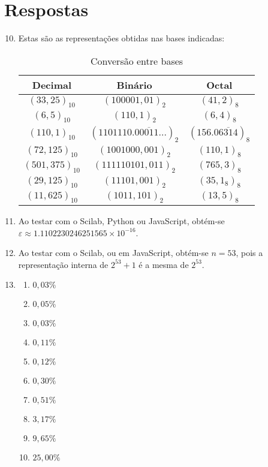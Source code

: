 \documentclass[12pt,a4paper]{article}
\begin{document}
\newpage
\section*{Respostas}
\begin{enumerate}
\setcounter{enumi}{9}
\item Estas são as representações obtidas nas bases indicadas:
\begin{table}[h]
\centering
\caption{Conversão entre bases}
\begin{tabular}{|c|c|c|}
\hline
  \textbf{Decimal}
& \textbf{Binário}
& \textbf{Octal} \\ \hline
  $(33,25)_{10}$
& $(100001,01)_2$
& $(41,2)_8$ \\ \hline
  $(6,5)_{10}$
& $(110,1)_2$
& $(6,4)_8$ \\ \hline
  $(110,1)_{10}$
& $(1101110.0\overline{0011}...)_2$
& $(156.0\overline{6314})_8$ \\ \hline
  $(72,125)_{10}$
& $(1001000,001)_2$
& $(110,1)_8$ \\ \hline
  $(501,375)_{10}$
& $(111110101,011)_2$
& $(765,3)_8$ \\ \hline
  $(29,125)_{10}$
& $(11101,001)_2$
& $(35,1_8)_8$ \\ \hline
  $(11,625)_{10}$
& $(1011,101)_2$
& $(13,5)_8$ \\ \hline
\end{tabular}
\end{table}

\item Ao testar com o Scilab, Python ou JavaScript, obtém-se $\varepsilon \approx 1.1102230246251565 \times 10 ^{-16}$.

\item Ao testar com o Scilab, ou em JavaScript, obtém-se $n=53$, pois a representação interna de $2^{53} +1$ é a mesma de $2^{53}$.

\item
\begin{multicols}{5}
\begin{enumerate}
\item $0,03\%$
\item $0,05\%$
\item $0,03\%$
\item $0,11\%$
\item $0,12\%$
\item $0,30\%$
\item $0,51\%$
\item $3,17\%$
\item $9,65\%$
\item $25,00\%$
\end{enumerate}
\end{multicols}


\end{enumerate}
\end{document}
